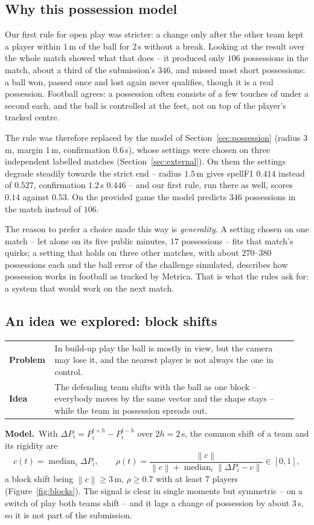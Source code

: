 \documentclass[11pt,a4paper]{article}
\makeatletter
\newcommand{\triple}[3]{%
  \par\medskip\noindent
  \begin{tabular}{@{}p{0.13\linewidth}@{\hspace{0.6em}}p{0.82\linewidth}@{}}
  \textbf{Problem} & #1\\[0.3em]
  \textbf{Idea}    & #2
  \end{tabular}\par\smallskip\noindent
  \textbf{Model.}\ #3\par\medskip}
\newcommand{\norm}[1]{\left\lVert #1 \right\rVert}
\makeatother
\begin{document}
\subsection{Why this possession model}\label{sec:whymodel}

Our first rule for open play was stricter: a change only after the other team kept a player
within $1$\,m of the ball for $2$\,s without a break. Looking at the result over the whole match
showed what that does -- it produced only $106$ possessions in the match, about a third of the submission's $346$, and
missed most short possessions: a ball won, passed once and lost again never qualifies, though it
is a real possession. Football agrees: a possession often consists of a few touches of under a
second each, and the ball is controlled at the feet, not on top of the player's tracked centre.

The rule was therefore replaced by the model of Section~\ref{sec:possession} (radius $3$\,m, margin
$1$\,m, confirmation $0.6$\,s), whose settings were chosen on three independent labelled matches
(Section~\ref{sec:external}). On them the settings degrade steadily towards the strict end --
radius $1.5$\,m gives spellF1 $0.414$ instead of $0.527$, confirmation $1.2$\,s $0.446$ -- and our
first rule, run there as well, scores $0.14$ against $0.53$. On the provided game the model predicts $346$ possessions in the match instead of $106$.

The reason to prefer a choice made this way is \emph{generality}. A setting chosen on one match --
let alone on its five public minutes, $17$ possessions -- fits that match's quirks; a setting that
holds on three other matches, with about $270$--$380$ possessions each and the ball error of the
challenge simulated, describes how possession works in football as tracked by Metrica. That is
what the rules ask for: a system that would work on the next match.

\subsection{An idea we explored: block shifts}

\triple{In build-up play the ball is mostly in view, but the camera may lose it, and the
nearest player is not always the one in control.}
{The defending team shifts with the ball as one block -- everybody moves by the same vector
and the shape stays -- while the team in possession spreads out.}
{With $\Delta P_i=P_i^{t+h}-P_i^{t-h}$ over $2h=2$\,s, the common shift of a team and its
rigidity are
\begin{equation}
  c(t)=\operatorname{median}_i\Delta P_i,\qquad
  \rho(t)=\frac{\norm{c}}{\norm{c}+\operatorname{median}_i\norm{\Delta P_i-c}}\in[0,1],
\end{equation}
a block shift being $\norm{c}\ge 3$\,m, $\rho\ge 0.7$ with at least $7$ players
(Figure~\ref{fig:blocks}). The signal is clear in single moments but symmetric -- on a switch
of play both teams shift -- and it lags a change of possession by about $3$\,s, so it is not
part of the submission.}
\end{document}
